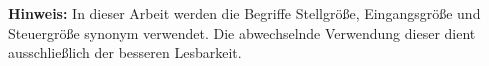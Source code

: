 \textbf{Hinweis:} In dieser Arbeit werden die Begriffe Stellgröße, Eingangsgröße und Steuergröße synonym verwendet. Die abwechselnde Verwendung dieser dient ausschließlich der besseren Lesbarkeit. 



